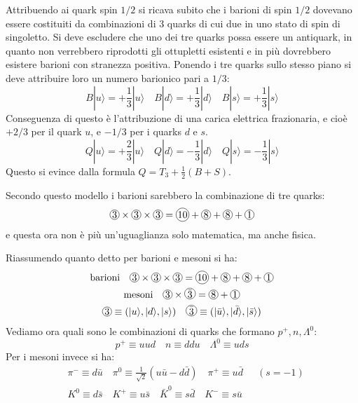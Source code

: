 Attribuendo ai quark spin $1/2$ si ricava subito che i barioni di spin $1/2$ 
dovevano essere costituiti da
combinazioni di 3 quarks di cui due in uno stato di spin di singoletto.
Si deve escludere che uno dei tre quarks possa essere un antiquark, in quanto 
non verrebbero riprodotti
gli ottupletti esistenti e in più dovrebbero esistere barioni con stranezza 
positiva.
Ponendo i tre quarks sullo stesso piano si deve attribuire loro un numero 
barionico pari a $1/3$:
\begin{equation}
B|u\rangle=+\frac{1}{3}|u\rangle\quad B|d\rangle=+\frac{1}{3}|d\rangle\quad
B|s\rangle=+\frac{1}{3}|s\rangle
\end{equation}
Conseguenza di questo è l'attribuzione di una carica elettrica frazionaria, e 
cioè $+2/3$ per il quark $u$, e
$-1/3$ per i quarks $d$ e $s$.
\begin{equation}
Q|u\rangle=+\frac{2}{3}|u\rangle\quad Q|d\rangle=-\frac{1}{3}|d\rangle\quad 
Q|s\rangle=-\frac{1}{3}|s\rangle
\end{equation}
Questo si evince dalla formula $Q=T_3+\frac{1}{2}(B+S)$.

Secondo questo modello i barioni sarebbero la combinazione di tre quarks:
\[
\Ci{3}\times\Ci{3}\times\Ci{3}=\Ci{10}+\Ci{8}+\Ci{8}+\Ci{1}
\]
e questa ora non è più un'uguaglianza solo matematica, ma anche fisica.

 Riassumendo quanto detto per barioni e mesoni si ha:
\begin{gather}
\text{barioni}\quad 
\Ci{3}\times\Ci{3}\times\Ci{3}=\Ci{10}+\Ci{8}+\Ci{8}+\Ci{1}\\
\text{mesoni} \quad \Ci{3}\times\Ci{$\bar{3}$}=\Ci{8}+\Ci{1}\\
\Ci{3}\equiv(|u\rangle,|d\rangle,|s\rangle)\quad 
\Ci{$\bar{3}$}\equiv(|\bar{u}\rangle,|\bar{d}\rangle,|\bar{s}\rangle)
\end{gather}
Vediamo ora quali sono le combinazioni di quarks che formano $p^+,n,\Lambda^0$:
\begin{equation}
p^+\equiv uud\quad n\equiv ddu\quad \Lambda^0\equiv uds
\end{equation}
Per i mesoni invece si ha:
\begin{equation}
\begin{split}
&\pi^-\equiv d\bar{u}\quad 
\pi^0\equiv\frac{1}{\sqrt{2}}(u\bar{u}-d\bar{d})\quad \pi^+\equiv 
u\bar{d}\quad\;\,(s=-1)\\
&K^0\equiv d\bar{s}\quad K^+\equiv u\bar{s}\quad \bar{K}^0\equiv s\bar{d}\quad 
K^-\equiv s\bar{u}
\end{split}
\end{equation}

